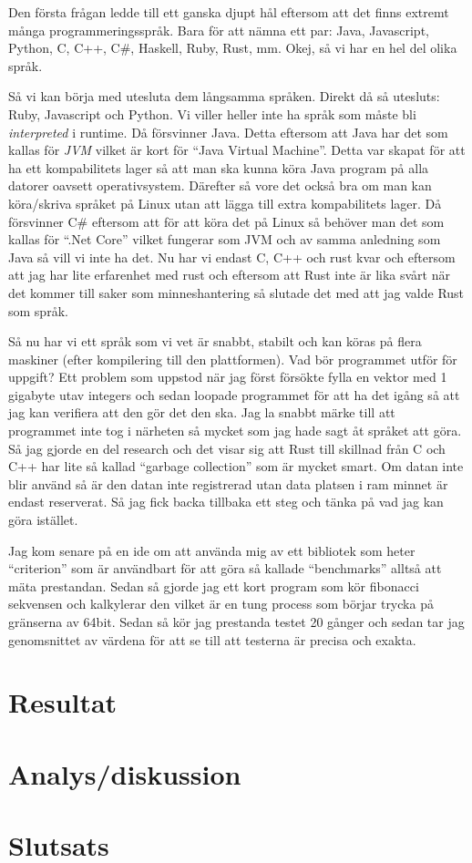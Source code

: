 \documentclass[12pt, a4paper]{report}
\begin{document}
Den första frågan ledde till ett ganska djupt hål eftersom att det finns extremt många programmeringsspråk. Bara för att nämna ett par: Java, Javascript, Python, C, C++, C\#, Haskell, Ruby, Rust, mm. Okej, så vi har en hel del olika språk.
 
Så vi kan börja med utesluta dem långsamma språken. Direkt då så utesluts: Ruby, Javascript och Python. Vi viller heller inte ha språk som måste bli \textit{interpreted} i runtime. Då försvinner Java. Detta eftersom att Java har det som kallas för \textit{JVM} vilket är kort för ``Java Virtual Machine''. Detta var skapat för att ha ett kompabilitets lager så att man ska kunna köra Java program på alla datorer oavsett operativsystem. Därefter så vore det också bra om man kan köra/skriva språket på Linux utan att lägga till extra kompabilitets lager. Då försvinner C\# eftersom att för att köra det på Linux så behöver man det som kallas för ``.Net Core'' vilket fungerar som JVM och av samma anledning som Java så vill vi inte ha det. Nu har vi endast C, C++ och rust kvar och eftersom att jag har lite erfarenhet med rust och eftersom att Rust inte är lika svårt när det kommer till saker som minneshantering så slutade det med att jag valde Rust som språk.
 
 
Så nu har vi ett språk som vi vet är snabbt, stabilt och kan köras på flera maskiner (efter kompilering till den plattformen). Vad bör programmet utför för uppgift? Ett problem som uppstod när jag först försökte fylla en vektor med 1 gigabyte utav integers och sedan loopade programmet för att ha det igång så att jag kan verifiera att den gör det den ska. Jag la snabbt märke till att programmet inte tog i närheten så mycket som jag hade sagt åt språket att göra. Så jag gjorde en del research och det visar sig att Rust till skillnad från C och C++ har lite så kallad ``garbage collection'' som är mycket smart. Om datan inte blir använd så är den datan inte registrerad utan data platsen i ram minnet är endast reserverat. Så jag fick backa tillbaka ett steg och tänka på vad jag kan göra istället.
 
Jag kom senare på en ide om att använda mig av ett bibliotek som heter ``criterion'' som är användbart för att göra så kallade ``benchmarks'' alltså att mäta prestandan. Sedan så gjorde jag ett kort program som kör fibonacci sekvensen och kalkylerar den vilket är en tung process som börjar trycka på gränserna av 64bit. Sedan så kör jag prestanda testet 20 gånger och sedan tar jag genomsnittet av värdena för att se till att testerna är precisa och exakta.
 
 


\section{Resultat}

\section{Analys/diskussion}



\section{Slutsats}


\printbibliography
\end{document}
